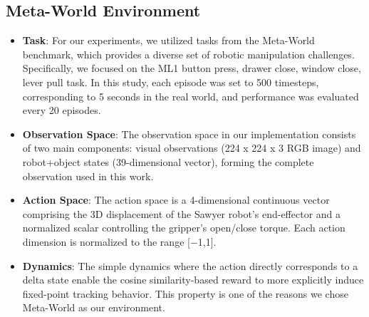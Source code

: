 \documentclass[11pt]{article}
\begin{document}
\subsection{Meta-World Environment}
\begin{itemize}
\item \textbf{Task}: For our experiments, we utilized tasks from the Meta-World benchmark, which provides a diverse set of robotic manipulation challenges. Specifically, we focused on the ML1 button press, drawer close, window close, lever pull task. In this study, each episode was set to 500 timesteps, corresponding to 5 seconds in the real world, and performance was evaluated every 20 episodes. 
\item \textbf{Observation Space}: The observation space in our implementation consists of two main components: visual observations (224 x 224 x 3 RGB image) and robot+object states (39-dimensional vector), forming the complete observation used in this work.
\item \textbf{Action Space}: The action space is a 4-dimensional continuous vector comprising the 3D displacement of the Sawyer robot’s end-effector and a normalized scalar controlling the gripper’s open/close torque. Each action dimension is normalized to the range [−1,1].
\item \textbf{Dynamics}: The simple dynamics where the action directly corresponds to a delta state enable the cosine similarity-based reward to more explicitly induce fixed-point tracking behavior. This property is one of the reasons we chose Meta-World as our environment. 
\end{itemize}
\end{document}
